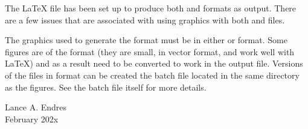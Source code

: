 The \LaTeX{} file has been set up to produce both  and  formats as output.  There are a few issues that are associated with using graphics with both  and  files.

The graphics used to generate the  format must be in either  or  format.  Some figures are of the  format (they are small, in vector format, and work well with \LaTeX) and as a result need to be converted to work in the  output file.  Versions of the  files in  format can be created the batch file  located in the same directory as the figures.  See the batch file itself for more details.

\vspace{\baselineskip}
\noindent Lance A. Endres \\February 202x 